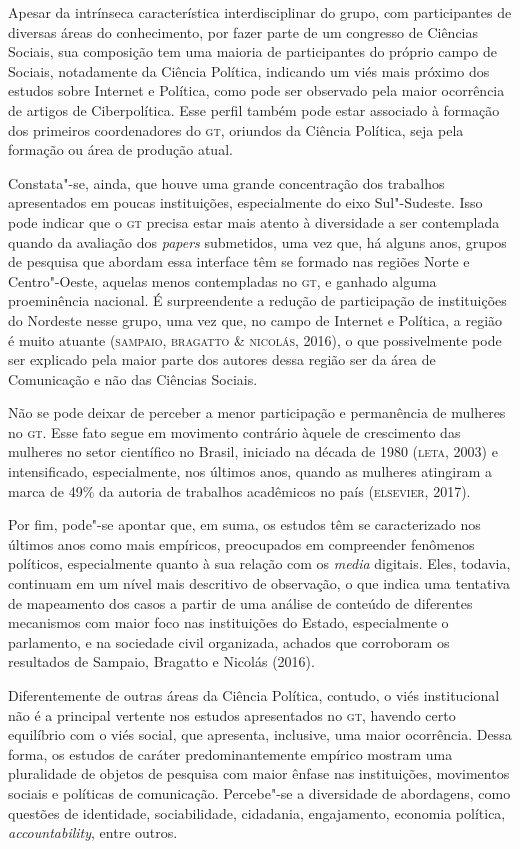 Apesar da intrínseca característica interdisciplinar do grupo, com
participantes de diversas áreas do conhecimento, por fazer parte de um
congresso de Ciências Sociais, sua composição tem uma maioria de
participantes do próprio campo de Sociais, notadamente da Ciência
Política, indicando um viés mais próximo dos estudos sobre Internet e
Política, como pode ser observado pela maior ocorrência de artigos de
Ciberpolítica. Esse perfil também pode estar associado à formação dos
primeiros coordenadores do \textsc{gt}, oriundos da Ciência Política, seja pela
formação ou área de produção atual.

Constata"-se, ainda, que houve uma grande concentração dos trabalhos
apresentados em poucas instituições, especialmente do eixo Sul"-Sudeste.
Isso pode indicar que o \textsc{gt} precisa estar mais atento à diversidade a ser
contemplada quando da avaliação dos \emph{papers} submetidos, uma vez
que, há alguns anos, grupos de pesquisa que abordam essa interface têm
se formado nas regiões Norte e Centro"-Oeste, aquelas menos contempladas
no \textsc{gt}, e ganhado alguma proeminência nacional. É surpreendente a redução
de participação de instituições do Nordeste nesse grupo, uma vez que, no
campo de Internet e Política, a região é muito atuante (\textsc{sampaio,
bragatto \& nicolás}, 2016), o que possivelmente pode ser explicado pela
maior parte dos autores dessa região ser da área de Comunicação e
não das Ciências Sociais.

Não se pode deixar de perceber a menor participação e permanência de
mulheres no \textsc{gt}. Esse fato segue em movimento contrário àquele de
crescimento das mulheres no setor científico no Brasil, iniciado na
década de 1980 (\textsc{leta}, 2003) e intensificado, especialmente, nos últimos
anos, quando as mulheres atingiram a marca de 49\% da autoria de
trabalhos acadêmicos no país (\textsc{elsevier}, 2017).

Por fim, pode"-se apontar que, em suma, os estudos têm se caracterizado
nos últimos anos como mais empíricos, preocupados em compreender
fenômenos políticos, especialmente quanto à sua relação com os
\emph{media} digitais. Eles, todavia, continuam em um nível mais
descritivo de observação, o que indica uma tentativa de mapeamento dos
casos a partir de uma análise de conteúdo de diferentes mecanismos com
maior foco nas instituições do Estado, especialmente o parlamento, e na
sociedade civil organizada, achados que corroboram os resultados de
Sampaio, Bragatto e Nicolás (2016).

Diferentemente de outras áreas da Ciência Política, contudo, o viés
institucional não é a principal vertente nos estudos apresentados no \textsc{gt},
havendo certo equilíbrio com o viés social, que apresenta, inclusive,
uma maior ocorrência. Dessa forma, os estudos de caráter
predominantemente empírico mostram uma pluralidade de objetos de
pesquisa com maior ênfase nas instituições, movimentos sociais e
políticas de comunicação. Percebe"-se a diversidade de abordagens, como
questões de identidade, sociabilidade, cidadania, engajamento, economia
política, \emph{accountability}, entre outros.

